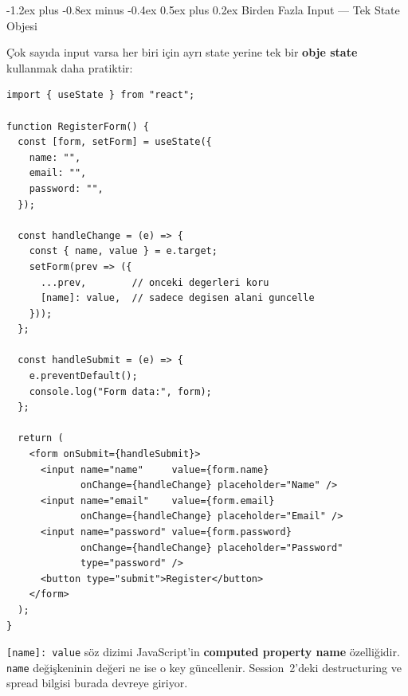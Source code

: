 \documentclass[12pt, a4paper]{article}
\makeatletter
\renewcommand{\subsection}{%
  \@startsection{subsection}{2}{\z@}%
    {-1.2ex plus -0.8ex minus -0.4ex}%
    {0.5ex plus 0.2ex}%
    {\normalfont\large\bfseries\sffamily\color{secondary}}%
}
\makeatother
\begin{document}
\newpage
\subsection{Birden Fazla Input --- Tek State Objesi}

Çok sayıda input varsa her biri için ayrı state yerine
tek bir \textbf{obje state} kullanmak daha pratiktir:

\vspace{6pt}

\begin{tcolorbox}[enhanced, colback=codebg, colframe=gray!30,
    colbacktitle=primary!85!black, coltitle=white, arc=4pt,
    title={\sffamily\bfseries\small Obje State ile Çoklu Input}]
\begin{lstlisting}[style=jsxstyle]
import { useState } from "react";

function RegisterForm() {
  const [form, setForm] = useState({
    name: "",
    email: "",
    password: "",
  });

  const handleChange = (e) => {
    const { name, value } = e.target;
    setForm(prev => ({
      ...prev,        // onceki degerleri koru
      [name]: value,  // sadece degisen alani guncelle
    }));
  };

  const handleSubmit = (e) => {
    e.preventDefault();
    console.log("Form data:", form);
  };

  return (
    <form onSubmit={handleSubmit}>
      <input name="name"     value={form.name}
             onChange={handleChange} placeholder="Name" />
      <input name="email"    value={form.email}
             onChange={handleChange} placeholder="Email" />
      <input name="password" value={form.password}
             onChange={handleChange} placeholder="Password"
             type="password" />
      <button type="submit">Register</button>
    </form>
  );
}
\end{lstlisting}
\end{tcolorbox}

\vspace{6pt}

\begin{infobox}
\texttt{[name]: value} söz dizimi JavaScript'in
\textbf{computed property name} özelliğidir. \texttt{name} değişkeninin
değeri ne ise o key güncellenir. Session~2'deki destructuring ve
spread bilgisi burada devreye giriyor.
\end{infobox}
\end{document}
